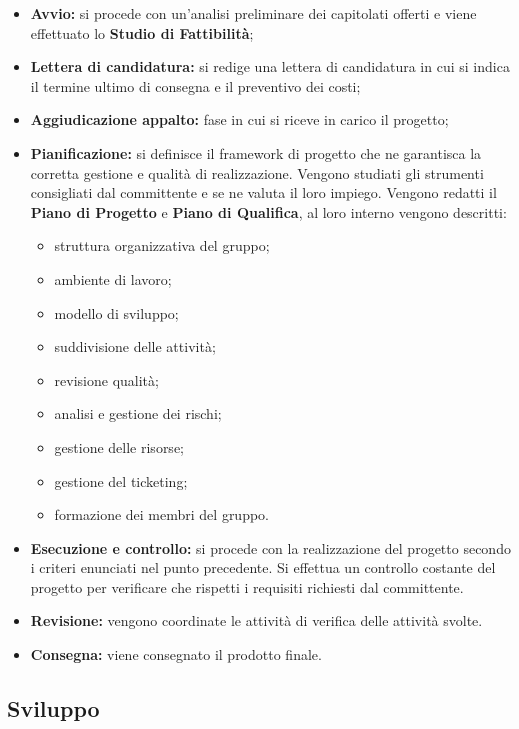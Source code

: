 \begin{itemize}
    \item \textbf{Avvio:} si procede con un'analisi preliminare dei capitolati offerti e viene effettuato lo \textbf{Studio di Fattibilità};
    \item \textbf{Lettera di candidatura:} si redige una lettera di candidatura in cui si indica il termine ultimo di consegna e il preventivo dei costi;
    \item \textbf{Aggiudicazione appalto:} fase in cui si riceve in carico il progetto;
    \item \textbf{Pianificazione:} si definisce il framework di progetto che ne garantisca la corretta gestione e qualità di realizzazione. Vengono studiati gli strumenti consigliati dal committente e se ne valuta il loro impiego. Vengono redatti il \textbf{Piano di Progetto} e \textbf{Piano di Qualifica}, al loro interno vengono descritti:
    \begin{itemize}
        \item {struttura organizzativa del gruppo;}
        \item {ambiente di lavoro;}
        \item {modello di sviluppo;}
        \item {suddivisione delle attività;}
        \item {revisione qualità;}
        \item {analisi e gestione dei rischi;}
        \item {gestione delle risorse;}
        \item {gestione del ticketing;}
        \item {formazione dei membri del gruppo.}
\end{itemize}
    \item \textbf{Esecuzione e controllo:} si procede con la realizzazione del progetto secondo i criteri enunciati nel punto precedente. Si effettua un controllo costante del progetto per verificare che rispetti i requisiti richiesti dal committente.
    \item \textbf{Revisione:} vengono coordinate le attività di verifica delle attività svolte.
    \item \textbf{Consegna:} viene consegnato il prodotto finale.
\end{itemize}
\subsection{Sviluppo}

